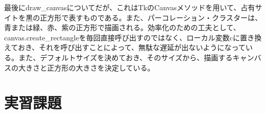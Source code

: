 \documentclass{jsarticle}
\begin{document}
        最後にdraw\_canvasについてだが、これはTkのCanvasメソッドを用いて、占有サイトを黒の正方形で表すものである。また、パーコレーション・クラスターは、青または緑、赤、紫の正方形で描画される。効率化のための工夫として、canvas.create\_rectangleを毎回直接呼び出すのではなく、ローカル変数cに置き換えておき、それを呼び出すことによって、無駄な遅延が出ないようになっている。また、デフォルトサイズを決めておき、そのサイズから、描画するキャンバスの大きさと正方形の大きさを決定している。
    
            
            
    \section{実習課題}
    
\end{document}
